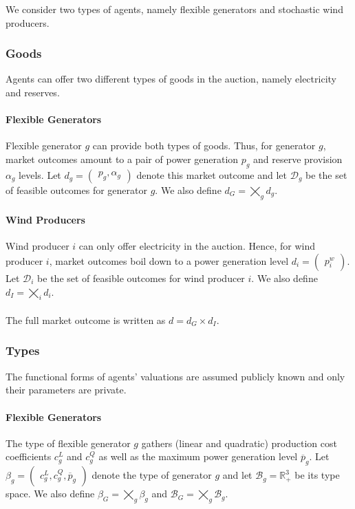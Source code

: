 \documentclass{article}
\begin{document}
We consider two types of agents, namely flexible generators and stochastic wind producers.

\subsubsection{Goods}

Agents can offer two different types of goods in the auction, namely electricity and reserves.

\paragraph{Flexible Generators} Flexible generator $g$ can provide both types of goods. Thus, for generator $g$, market outcomes amount to a pair of power generation $p_g$ and reserve provision $\alpha_g$ levels. Let $d_g = \begin{pmatrix} p_g, \alpha_g \end{pmatrix}$ denote this market outcome and let $\mathcal{D}_g$ be the set of feasible outcomes for generator $g$. We also define $d_G = \bigtimes_g d_g$.

\paragraph{Wind Producers} Wind producer $i$ can only offer electricity in the auction. Hence, for wind producer $i$, market outcomes boil down to a power generation level $d_i = \begin{pmatrix} p_i^w \end{pmatrix}$. Let $\mathcal{D}_i$ be the set of feasible outcomes for wind producer $i$. We also define $d_I = \bigtimes_i d_i$.

\paragraph{} The full market outcome is written as $d = d_G \times d_I$.

\subsubsection{Types}

The functional forms of agents' valuations are assumed publicly known and only their parameters are private.

\paragraph{Flexible Generators} The type of flexible generator $g$ gathers (linear and quadratic) production cost coefficients $c_g^L$ and $c_g^Q$ as well as the maximum power generation level $\overline{p}_g$. Let $\beta_g = \begin{pmatrix} c_g^L, c_g^Q, \overline{p}_g\end{pmatrix}$ denote the type of generator $g$ and let $\mathcal{B}_g = \mathbb{R}_+^3$ be its type space. We also define $\beta_G = \bigtimes_g \beta_g$ and $\mathcal{B}_G = \bigtimes_g \mathcal{B}_g$.
\end{document}
